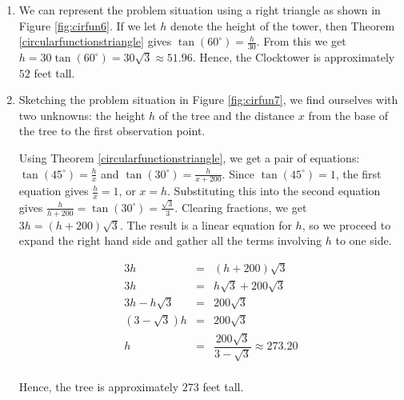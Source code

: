{
\begin{enumerate}

\item  We can represent the problem situation using a right triangle as shown in Figure \ref{fig:cirfun6}.  If we let $h$ denote the height of the tower, then Theorem \ref{circularfunctionstriangle} gives $\tan\left(60^{\circ}\right) = \frac{h}{30}$.  From this we get $h = 30 \tan\left(60^{\circ}\right) = 30 \sqrt{3} \approx 51.96$.  Hence, the Clocktower is approximately $52$ feet tall.




\item  Sketching the problem situation in Figure \ref{fig:cirfun7}, we find ourselves with two unknowns: the height $h$ of the tree and the distance $x$ from the base of the tree to the first observation point. 



Using Theorem \ref{circularfunctionstriangle}, we get a pair of equations:  $\tan\left(45^{\circ}\right) = \frac{h}{x}$ and $\tan\left(30^{\circ}\right) = \frac{h}{x+200}$.  Since $\tan\left(45^{\circ}\right) = 1$, the first equation gives $\frac{h}{x} = 1$, or $x = h$.  Substituting this into the second equation gives $\frac{h}{h+200} = \tan\left(30^{\circ}\right) = \frac{\sqrt{3}}{3}$.  Clearing fractions,  we get $3h = (h+200) \sqrt{3}$.  The result is a linear equation for $h$, so we proceed to expand the right hand side and gather all the terms involving $h$ to one side.

\[ \begin{array}{rcl}

3h & = & (h+200)\sqrt{3} \\ [5pt]
3h & = & h \sqrt{3} + 200 \sqrt{3} \\ [5pt]
3h - h \sqrt{3} & = & 200 \sqrt{3} \\ [5pt]
(3-\sqrt{3}) h & = & 200 \sqrt{3} \\ [5pt]
h & = & \dfrac{200\sqrt{3}}{3-\sqrt{3}} \approx 273.20 \\ \end{array} \] 


Hence, the tree is approximately $273$ feet tall.  

\end{enumerate}
} 

